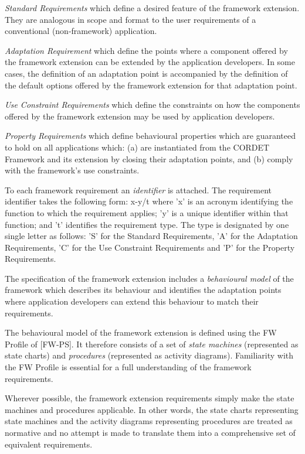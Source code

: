 \documentclass{pnp_article}
\begin{document}
\begin{fw_itemize}
\item{} \textit{Standard Requirements} which define a desired feature of the framework extension. They are analogous in scope and format to the user requirements of a conventional (non-framework) application.
\item{} \textit{Adaptation Requirement} which define the points where a component offered by the framework extension can be extended by the application developers. In some cases, the definition of an adaptation point is accompanied by the definition of the default options offered by the framework extension for that adaptation point.  
\item{} \textit{Use Constraint Requirements} which define the constraints on how the components offered by the framework extension may be used by application developers.
\item{} \textit{Property Requirements} which define behavioural properties which are guaranteed to hold on all applications which: (a) are instantiated from the CORDET Framework and its extension by closing their adaptation points, and (b) comply with the framework's use constraints.
\end{fw_itemize}

To each framework requirement an \textit{identifier} is attached.
The requirement identifier takes the following form: x-y/t where 'x' is an acronym identifying the function to which the requirement applies; 'y' is a unique identifier within that function; and 't' identifies the requirement type. 
The type is designated by one single letter as follows: 'S' for the Standard Requirements, 'A' for the Adaptation Requirements, 'C' for the Use Constraint Requirements and 'P' for the Property Requirements.

The specification of the framework extension includes a \textit{behavioural model} of the framework which describes its behaviour and identifies the adaptation points where application developers can extend this behaviour to match their requirements.  

The behavioural model of the framework extension is defined using the FW Profile of [FW-PS]. It therefore consists of a set of \textit{state machines} (represented as state charts) and \textit{procedures} (represented as  activity diagrams). Familiarity with the FW Profile is essential for a full understanding of the framework requirements.

Wherever possible, the framework extension requirements simply make the state machines and procedures applicable. In other words, the state charts representing state machines and the activity diagrams representing procedures are treated as normative and no attempt is made to translate them into a comprehensive set of equivalent requirements.
\end{document}
